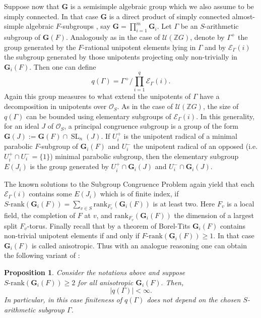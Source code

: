 \documentclass[a4paper,10pt]{amsart}
\newtheorem{proposition}[lemma]{Proposition}
\theoremstyle{definition}
\theoremstyle{remark}
\newcommand{\SL}{\operatorname{SL}}
\newcommand{\U}{{\mathcal U}}
\newcommand\mc{\mathcal}
\newcommand{\Z}{{\mathbb Z}}
\begin{document}
Suppose now that $\mathbf{G}$ is a semisimple algebraic group which we also assume to be simply connected. In that case $\mathbf{G}$ is a direct product of simply connected almost-simple algebraic $F$-subgroups \cite[Theorem 2.6]{PlaRapBook}, say $\mathbf{G} = \prod_{i=1}^m \mathbf{G}_i$. Let $\Gamma$ be an $S$-arithmetic subgroup of $\mathbf{G}(F)$.  Analogously as in the case of $\U (\Z G)$, denote by $\Gamma^+$ the group generated by the $F$-rational unipotent elements lying in $\Gamma$ and by $\mc{E}_{\Gamma}(i)$ the subgroup generated by those unipotents projecting only non-trivially in $\mathbf{G}_i(F)$. Then one can define
\begin{equation*}
q(\Gamma) = \Gamma^+ / \prod_{i=1}^q \mc{E}_{\Gamma}(i).
\end{equation*}
Again this group measures to what extend the unipotents of $\Gamma$ have a decomposition in unipotents over $\mc{O}_S$. As in the case of $\U(\Z G)$, the size of $q(\Gamma)$ can be bounded using elementary subgroups of $\mc{E}_{\Gamma}(i)$. In this generality, for an ideal $J$ of $\mc{O}_S$, a principal congruence subgroup is a group of the form $\mathbf{G}(J) := \mathbf{G}(F) \cap \SL_n(J).$ If $U_i^+$ is the unipotent radical of a minimal parabolic $F$-subgroup of $\mathbf{G}_i(F)$ and $U_i^{-}$ the unipotent radical of an opposed (i.e. $U_i^+ \cap U_i^- = \{ 1 \}$)  minimal parabolic subgroup, then the elementary subgroup $E(J_i)$ is the group generated by $U_i^+ \cap \mathbf{G}_i(J)$ and $U_i^- \cap \mathbf{G}_i(J)$. 

The known solutions to the Subgroup Congruence Problem \cite{Ragh,Venkataramana} again yield that each $\mc{E}_{\Gamma}(i)$ contains some $E(J_i)$ which is of finite index, if $S\text{-rank}(\mathbf{G}_i(F)) = \sum_{v \in S} \text{rank}_{F_v}(\mathbf{G}_i(F))$ is at least two. Here  $F_v$ is a local field, the completion of $F$ at $v$, and $\text{rank}_{F_v}(\mathbf{G}_i(F))$ the dimension of a largest split $F_v$-torus. Finally recall that by a theorem of Borel-Tits \cite{BorelTits} $\mathbf{G}_i(F)$ contains non-trivial unipotent elements if and only if $F\text{-rank}(\mathbf{G}_i(F)) \geq 1$. In that case $\mathbf{G}_i(F)$ is called anisotropic. Thus with an analogue reasoning one can obtain the following variant of :
\begin{proposition}\label{if no exceptional then finite for general grp}
Consider the notations above and suppose $ S\text{-rank}(\mathbf{G}_i(F)) \geq 2$ for all anisotropic $\mathbf{G}_i(F).$ Then, $$|q(\Gamma)|< \infty. $$
In particular, in this case finiteness of $q(\Gamma)$ does not depend on the chosen $S$-arithmetic subgroup $\Gamma$.
\end{proposition}
\end{document}
